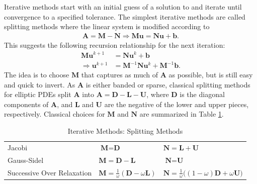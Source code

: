 Iterative methods start with an initial guess of a solution to  and iterate until convergence to a specified tolerance. The simplest iterative methods are called splitting methods where the linear system is modified according to
\begin{align}
\textbf{A} = \textbf{M} - \textbf{N} \Rightarrow \textbf{M} \textbf{u} = \textbf{N} \textbf{u} + \textbf{b}.
\end{align}
This suggests the following recursion relationship for the next iteration:
\begin{align}
\textbf{M} \textbf{u}^{k+1} &= \textbf{N} \textbf{u}^k + \textbf{b} \\
\Rightarrow \textbf{u}^{k+1} &= \textbf{M}^{-1} \textbf{N} \textbf{u}^k + \textbf{M}^{-1} \textbf{b}.
\end{align}
The idea is to choose $\textbf{M}$ that captures as much of $\textbf{A}$ as possible, but is still easy and quick to invert. As $\textbf{A}$ is either banded or sparse, classical splitting methods for elliptic PDEs split $\textbf{A}$ into $\textbf{A} = \textbf{D} - \textbf{L} - \textbf{U}$, where $\textbf{D}$ is the diagonal components of $\textbf{A}$, and $\textbf{L}$ and $\textbf{U}$ are the negative of the lower and upper pieces, respectively. Classical choices for $\textbf{M}$ and $\textbf{N}$ are summarized in Table \ref{tab:splitting}.

\begin{table}[h!]
    \centering
    \caption{Iterative Methods: Splitting Methods}
    \begin{tabular}{ | l | l | l |}
        \hline
        Jacobi & $\textbf{M} = \textbf{D}$ & $\textbf{N} = \textbf{L} + \textbf{U}$ \\
        Gauss-Sidel & $\textbf{M} = \textbf{D} - \textbf{L}$ & $\textbf{N} = \textbf{U}$ \\
        Successive Over Relaxation & $\textbf{M} = \frac{1}{\omega}(\textbf{D} - \omega \textbf{L})$ & $\textbf{N} = \frac{1}{\omega} \big( (1 - \omega) \textbf{D} + \omega \textbf{U} \big)$ \\
        \hline
    \end{tabular}
    \label{tab:splitting}
\end{table}

